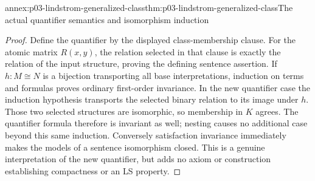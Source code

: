 \begin{annexitem}{annex:p03-lindstrom-generalized-class}{thm:p03-lindstrom-generalized-class}{The actual quantifier semantics and isomorphism induction}
\begin{proof}
Define the quantifier by the displayed class-membership clause. For the
atomic matrix \(R(x,y)\), the relation selected in that clause is exactly
the relation of the input structure, proving the defining sentence assertion.
If \(h:M\cong N\) is a bijection transporting all base interpretations,
induction on terms and formulas proves ordinary first-order invariance.
In the new quantifier case the induction hypothesis transports the selected
binary relation to its image under \(h\). Those two selected structures
are isomorphic, so membership in \(K\) agrees. The quantifier formula
therefore is invariant as well; nesting causes no additional case beyond
this same induction. Conversely satisfaction invariance immediately makes
the models of a sentence isomorphism closed. This is a genuine interpretation
of the new quantifier, but adds no axiom or construction establishing
compactness or an LS property.
\end{proof}
\end{annexitem}


